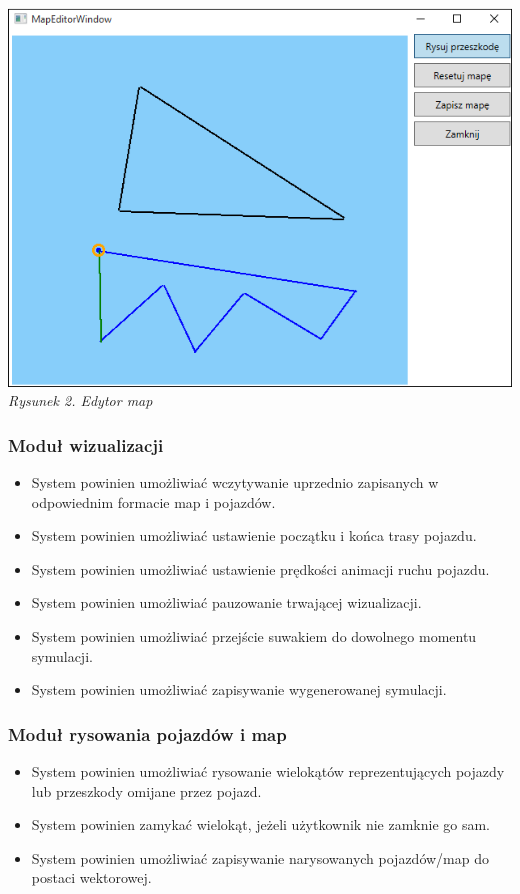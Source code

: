 \documentclass{article}
\begin{document}
\begin{center}
\includegraphics[scale=0.7]{mapeditor}\\
\textit{Rysunek 2. Edytor map}
\end{center}

\subsubsection{Moduł wizualizacji}
\begin{itemize}
  \item System powinien umożliwiać wczytywanie uprzednio zapisanych w odpowiednim formacie map i pojazdów.
  \item System powinien umożliwiać ustawienie początku i końca trasy pojazdu.
  \item System powinien umożliwiać ustawienie prędkości animacji ruchu pojazdu.
  \item System powinien umożliwiać pauzowanie trwającej wizualizacji.
  \item System powinien umożliwiać przejście suwakiem do dowolnego momentu symulacji.
  \item System powinien umożliwiać zapisywanie wygenerowanej symulacji.
\end{itemize}

\subsubsection{Moduł rysowania pojazdów i map}
\begin{itemize}
  \item System powinien umożliwiać rysowanie wielokątów reprezentujących pojazdy lub przeszkody omijane przez pojazd.
  \item System powinien zamykać wielokąt, jeżeli użytkownik nie zamknie go sam.
  \item System powinien umożliwiać zapisywanie narysowanych pojazdów/map do postaci wektorowej.
\end{itemize}
\end{document}
